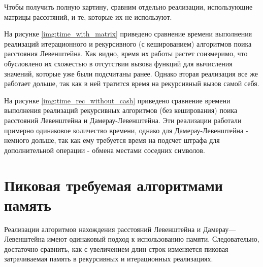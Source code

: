  Чтобы получить полную картину, сравним отдельно реализации, использующие матрицы рассотяний, и те, которые их не используют.
 
 На рисунке \ref{img:time_with_matrix} приведено сравнение времени выполнения реализаций итерационного и рекурсивного (с кешированием) алгоритмов поика расстояния Левенштейна. Как видно, время их работы растет соизмеримо, что обусловлено их схожестью в отсутствии вызова функций для вычисления значений, которые уже были подсчитаны ранее. Однако вторая реализация все же работает дольше, так как в ней тратится время на рекурсивный вызов самой себя. 
 \newpage
 
 На рисунке \ref{img:time_rec_without_cash} приведено сравнение времени выполнения реализаций рекурсивных алгоритмов (без кеширования) поика расстояний Левенштейна и Дамерау-Левенштейна. Эти реализации работали примерно одинаковое количество времени, однако для Дамерау-Левенштейна - немного дольше, так как ему требуется время на подсчет штрафа для дополнительной операции - обмена местами соседних символов.
 
 \newpage
 
 



\newpage
\section{Пиковая требуемая алгоритмами память}

Реализации алгоритмов нахождения расстояний Левенштейна и Дамерау—Левенштейна имеют одинаковый подход к использованию памяти. Следовательно, достаточно сравнить, как с увеличением длин строк изменяется пиковая затрачиваемая память в рекурсивных и итерационных реализациях. 

